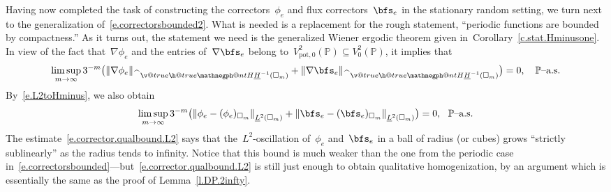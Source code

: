 \documentclass[11pt,twoside]{article} %
\makeatletter
\let\oldsquare\square %
\renewcommand{\square}{\oldsquare}
\numberwithin{equation}{section}
\theoremstyle{definition}
\let\originalleft\left
\let\originalright\right
\renewcommand{\left}{\mathopen{}\mathclose\bgroup\originalleft}
\renewcommand{\right}{\aftergroup\egroup\originalright}
\renewcommand*{\hat}{\widehat}
\newcommand{\pot}{\mathrm{pot}}
\newcommand{\cu}{\square}
\renewcommand{\P}{\mathbb{P}}
\newcommand{\negphantom}{\v@true\h@true\negph@nt}
\newcommand{\negph@nt}{\ifmmode\expandafter\mathpalette 
  \expandafter\mathnegph@nt\else\expandafter\makenegph@nt\fi}
\newcommand{\makenegph@nt}[1]{%
  \setbox\z@\hbox{\color@begingroup#1\color@endgroup}\finnegph@nt}
\newcommand{\finnegph@nt}{%
  \setbox\tw@\null 
  \ifv@ \ht\tw@\ht\z@\dp\tw@\dp\z@\fi \ifh@\wd\tw@-\wd\z@\fi\box\tw@}
\newcommand{\mathnegph@nt}[2]{%
  \setbox\z@\hbox{$\m@th #1{#2}$}\finnegph@nt}
\newcommand{\Hminusul}{\hat{\phantom{H}}\negphantom{H}\underline{H}^{-1}}
\makeatother
\begin{document}
Having now completed the task of constructing the correctors~$\phi_e$ and flux correctors~$\bfs_e$ in the stationary random setting, we turn next to the generalization of~\eqref{e.correctorsbounded2}. What is needed is a replacement for the rough statement, ``periodic functions are bounded by compactness.'' As it turns out, the statement we need is the generalized Wiener ergodic theorem given in~Corollary~\ref{c.stat.Hminusone}. In view of the fact that~$\nabla \phi_e$ and the entries of~$\nabla \bfs_e$ belong to~$V^2_{\pot,0}(\P) \subseteq V^2_0(\P)$, it implies that
\begin{equation}
\label{e.corrector.qualbound.Hm1}
\limsup_{m\to \infty}
3^{-m} 
\bigl(
\| \nabla \phi_e \|_{\Hminusul(\cu_m)}
+
\| \nabla \bfs_e \|_{\Hminusul(\cu_m)}
\bigr) = 0,
\quad \mbox{$\P$--a.s.}
\end{equation}
By~\eqref{e.L2toHminus}, we also obtain
\begin{equation}
\label{e.corrector.qualbound.L2}
\limsup_{m\to \infty}
3^{-m} 
\bigl(
\left\|  \phi_e - (\phi_e)_{\cu_m} \right\|_{\underline{L}^{2}(\cu_m)}
+
\left\|  \bfs_e - (\bfs_e)_{\cu_m} \right\|_{\underline{L}^{2}(\cu_m)}
\bigr) = 0,
\ \ \mbox{$\P$--a.s.}
\end{equation}
The estimate~\eqref{e.corrector.qualbound.L2} says that the~$L^2$-oscillation of~$\phi_e$ and~$\bfs_e$ in a ball of radius (or cubes) grows ``strictly sublinearly'' as the radius tends to infinity. Notice that this bound is much weaker than the one from the periodic case in~\eqref{e.correctorsbounded}---but~\eqref{e.corrector.qualbound.L2} is still just enough to obtain qualitative homogenization, by an argument which is essentially the same as the proof of Lemma~\ref{l.DP.2infty}.
\end{document}
